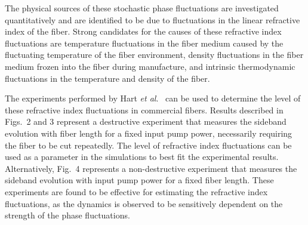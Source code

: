 The physical sources of these stochastic phase fluctuations are investigated 
quantitatively and are identified to be due to fluctuations in the linear 
refractive index of the fiber. Strong candidates for the causes of these 
refractive index fluctuations are temperature fluctuations in the fiber medium 
caused by the fluctuating temperature of the fiber environment, density 
fluctuations in the fiber medium frozen into the fiber during manufacture, and 
intrinsic thermodynamic fluctuations in the temperature and density of the 
fiber.  

The experiments performed by Hart {\it et al}.\ \cite{hart1} can be used to 
determine the level of these refractive index fluctuations in commercial 
fibers. Results described in Figs.\ 2 and 3 represent a destructive 
experiment that measures the sideband evolution with fiber length for a fixed 
input pump power, necessarily requiring the fiber to be cut repeatedly. The 
level of refractive index fluctuations can be used as a parameter in the 
simulations to best fit the experimental results. Alternatively, Fig.\ 4 
represents a non-destructive experiment that measures the sideband evolution 
with input pump power for a fixed fiber length. These experiments are found to 
be effective for estimating the refractive index fluctuations, as the dynamics 
is observed to be sensitively dependent on the strength of the phase 
fluctuations. 

